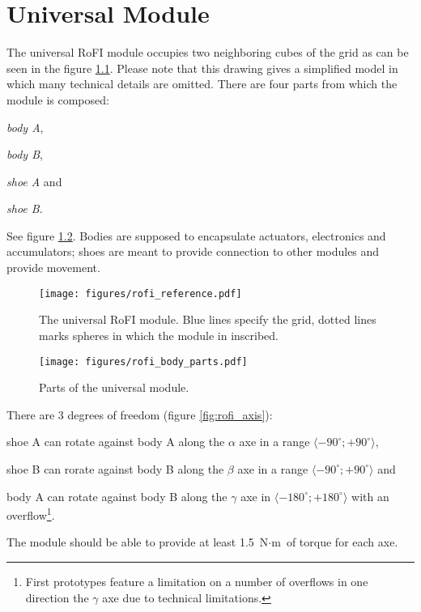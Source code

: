 \chapter{Universal Module}\label{chap:universal_module}


The universal RoFI module occupies two neighboring cubes of the grid as can be
seen in the figure \ref{fig:rofi_reference}. Please note that this drawing gives
a simplified model in which many technical details are omitted. There are four
parts from which the module is composed:
\begin{enumerate*}
    \item \emph{body A},
    \item \emph{body B},
    \item \emph{shoe A} and
    \item \emph{shoe B}.
\end{enumerate*}
See figure \ref{fig:rofi_body_parts}. Bodies are supposed to encapsulate
actuators, electronics and accumulators; shoes are meant to provide connection
to other modules and provide movement.

\begin{figure}
    \centering
    \texttt{[image: figures/rofi\_reference.pdf]}
    \caption{The universal RoFI module. Blue lines specify the grid, dotted
    lines marks spheres in which the module in inscribed. }
    \label{fig:rofi_reference}
\end{figure}

\begin{figure}
    \centering
    \texttt{[image: figures/rofi\_body\_parts.pdf]}
    \caption{Parts of the universal module.}
    \label{fig:rofi_body_parts}
\end{figure}

There are 3 degrees of freedom (figure \ref{fig:rofi_axis}):
\begin{enumerate*}
    \item shoe A can rotate against body A along the $\alpha$ axe in a range
    $\langle -90^\circ; +90^\circ\rangle$,
    \item shoe B can rorate against body B along the $\beta$ axe in a range
    $\langle -90^\circ; +90^\circ\rangle$ and
    \item body A can rotate against body B along the $\gamma$ axe in $\langle
    -180^\circ; +180^\circ\rangle$ with an overflow\footnote{First prototypes
    feature a limitation on a number of overflows in one direction the $\gamma$
    axe due to technical limitations. }.
\end{enumerate*}
The module should be able to provide at least 1.5 $\text{N}\cdot\text{m}$ of
torque for each axe.

